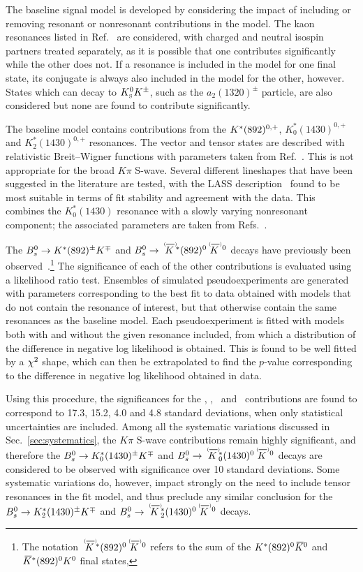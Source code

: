 The baseline signal model is developed by considering the impact of including or removing resonant or nonresonant contributions in the model.
The kaon resonances listed in Ref.~\cite{PDG2017} are considered, with charged and neutral isospin partners treated separately, as it is possible that one contributes significantly while the other does not.
If a resonance is included in the model for one final state, its conjugate is always also included in the model for the other, however.  
States which can decay to ${{K}^0_{\mathrm{ \scriptscriptstyle S}}}{{K}^\pm}$, such as the $a_2(1320)^\pm$ particle, are also considered but none are found to contribute significantly.

The baseline model contains contributions from the ${{K}^*}(892)^{0,+}$, $K^*_0(1430)^{0,+}$ and $K^*_2(1430)^{0,+}$ resonances.
The vector and tensor states are described with relativistic Breit--Wigner functions with parameters taken from Ref.~\cite{PDG2017}.
This is not appropriate for the broad $K\pi$ S-wave.
Several different lineshapes that have been suggested in the literature are tested, with the LASS description~\cite{lass} found to be most suitable in terms of fit stability and agreement with the data.  
This combines the $K^*_0(1430)$ resonance with a slowly varying nonresonant component; the associated parameters are taken from Refs.~\cite{PDG2017,lass2}.

The ${{B}^0_{s}}\rightarrow {\ensuremath{{K}^*}}(892)^{\pm}{{K}^\mp}$ and $\Bs \to \KstarIzoptbar\KorKbarz$ decays have previously been observed~\cite{LHCb-PAPER-2014-043,LHCb-PAPER-2015-018}.\footnote{
  The notation $\KstarIzoptbar\KorKbarz$ refers to the sum of the ${{K}^*}(892)^0{{\kern 0.2em\overline{\kern -0.2em K}{}}{}^0}$ and ${{\kern 0.2em\overline{\kern -0.2em K}{}}{}^*}(892)^0{{K}^0}$ final states, \etc
}
The significance of each of the other contributions is evaluated using a likelihood ratio test.  
Ensembles of simulated pseudoexperiments are generated with parameters corresponding to the best fit to data obtained with models that do not contain the resonance of interest, but that otherwise contain the same resonances as the baseline model.
Each pseudoexperiment is fitted with models both with and without the given resonance included, from which a distribution of the difference in negative log likelihood is obtained.
This is found to be well fitted by a $\chi^2$ shape, which can then be extrapolated to find the $p$-value corresponding to the difference in negative log likelihood obtained in data.  

Using this procedure, the significances for the \KstarIIp, \KstarIIz, \KstarIIIp\ and \KstarIIIz\ contributions are found to correspond to 17.3, 15.2, 4.0 and 4.8 standard deviations, when only statistical uncertainties are included.
Among all the systematic variations discussed in Sec.~\ref{sec:systematics}, the $K\pi$ S-wave contributions remain highly significant, and therefore the ${{B}^0_{s}}\rightarrow {\ensuremath{K}}^*_0(1430)^{\pm}{{K}^\mp}$ and $\Bs \to \KstarIIzoptbar\KorKbarz$ decays are considered to be observed with significance over 10 standard deviations.
Some systematic variations do, however, impact strongly on the need to include tensor resonances in the fit model, and thus preclude any similar conclusion for the ${{B}^0_{s}}\rightarrow {\ensuremath{K}}^*_2(1430)^{\pm}{{K}^\mp}$ and $\Bs \to \KstarIIIzoptbar\KorKbarz$ decays.

